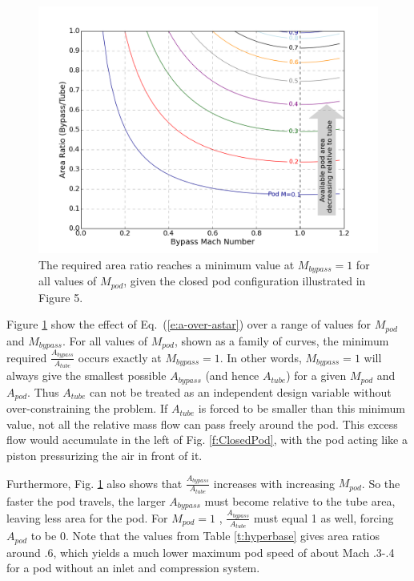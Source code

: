 \documentclass[heading.tex]{subfiles}
\begin{document}
\begin{figure}[!htb]
  \centering
  \includegraphics[width=.9\textwidth]{images/areaPlot.png}
  \caption{The required area ratio reaches a minimum value at $M_{bypass}=1$ for all values of $M_{pod}$, given the closed pod configuration illustrated in Figure 5.}
  \label{f:choked-flow}
\end{figure}

Figure \ref{f:choked-flow} show the effect of Eq.~(\ref{e:a-over-astar}) over a range of values for $M_{pod}$ and $M_{bypass}$. 
For all values of $M_{pod}$, shown as a family of curves, the minimum required $\frac{A_{bypass}}{A_{tube}}$ occurs exactly at $M_{bypass}=1$.
In other words, 
$M_{bypass}=1$ will always give the smallest possible $A_{bypass}$ (and hence $A_{tube}$) for a given 
$M_{pod}$ and $A_{pod}$. Thus $A_{tube}$ can not be treated as an independent design variable without over-constraining the problem.
If $A_{tube}$ is forced to be smaller than this minimum value, not all the relative mass flow can pass freely around the pod. This excess 
flow would accumulate in the left of Fig. \ref{f:ClosedPod}, with the pod acting like a piston pressurizing the 
air in front of it. 

Furthermore, Fig. \ref{f:choked-flow} also shows that $\frac{A_{bypass}}{A_{tube}}$ 
increases with increasing $M_{pod}$. So the faster the pod travels, the larger $A_{bypass}$ 
must become relative to the tube area, leaving less area for the pod. For $M_{pod} = 1$ , $\frac{A_{bypass}}{A_{tube}}$ must 
equal 1 as well, forcing $A_{pod}$ to be 0. Note that the values from Table \ref{t:hyperbase} gives area ratios around .6, 
which yields a much lower maximum pod speed of about Mach .3-.4 for a pod without an inlet and compression system. 
\end{document}
